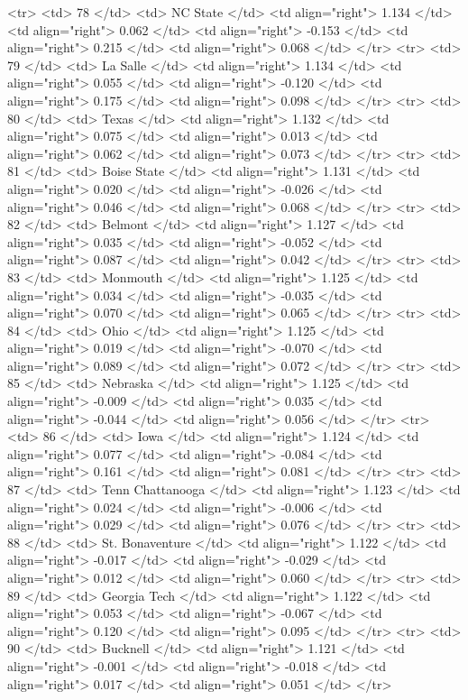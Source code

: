   <tr> <td> 78 </td> <td> NC State </td> <td align="right"> 1.134 </td> <td align="right"> 0.062 </td> <td align="right"> -0.153 </td> <td align="right"> 0.215 </td> <td align="right"> 0.068 </td> </tr>
  <tr> <td> 79 </td> <td> La Salle </td> <td align="right"> 1.134 </td> <td align="right"> 0.055 </td> <td align="right"> -0.120 </td> <td align="right"> 0.175 </td> <td align="right"> 0.098 </td> </tr>
  <tr> <td> 80 </td> <td> Texas </td> <td align="right"> 1.132 </td> <td align="right"> 0.075 </td> <td align="right"> 0.013 </td> <td align="right"> 0.062 </td> <td align="right"> 0.073 </td> </tr>
  <tr> <td> 81 </td> <td> Boise State </td> <td align="right"> 1.131 </td> <td align="right"> 0.020 </td> <td align="right"> -0.026 </td> <td align="right"> 0.046 </td> <td align="right"> 0.068 </td> </tr>
  <tr> <td> 82 </td> <td> Belmont </td> <td align="right"> 1.127 </td> <td align="right"> 0.035 </td> <td align="right"> -0.052 </td> <td align="right"> 0.087 </td> <td align="right"> 0.042 </td> </tr>
  <tr> <td> 83 </td> <td> Monmouth </td> <td align="right"> 1.125 </td> <td align="right"> 0.034 </td> <td align="right"> -0.035 </td> <td align="right"> 0.070 </td> <td align="right"> 0.065 </td> </tr>
  <tr> <td> 84 </td> <td> Ohio </td> <td align="right"> 1.125 </td> <td align="right"> 0.019 </td> <td align="right"> -0.070 </td> <td align="right"> 0.089 </td> <td align="right"> 0.072 </td> </tr>
  <tr> <td> 85 </td> <td> Nebraska </td> <td align="right"> 1.125 </td> <td align="right"> -0.009 </td> <td align="right"> 0.035 </td> <td align="right"> -0.044 </td> <td align="right"> 0.056 </td> </tr>
  <tr> <td> 86 </td> <td> Iowa </td> <td align="right"> 1.124 </td> <td align="right"> 0.077 </td> <td align="right"> -0.084 </td> <td align="right"> 0.161 </td> <td align="right"> 0.081 </td> </tr>
  <tr> <td> 87 </td> <td> Tenn Chattanooga </td> <td align="right"> 1.123 </td> <td align="right"> 0.024 </td> <td align="right"> -0.006 </td> <td align="right"> 0.029 </td> <td align="right"> 0.076 </td> </tr>
  <tr> <td> 88 </td> <td> St. Bonaventure </td> <td align="right"> 1.122 </td> <td align="right"> -0.017 </td> <td align="right"> -0.029 </td> <td align="right"> 0.012 </td> <td align="right"> 0.060 </td> </tr>
  <tr> <td> 89 </td> <td> Georgia Tech </td> <td align="right"> 1.122 </td> <td align="right"> 0.053 </td> <td align="right"> -0.067 </td> <td align="right"> 0.120 </td> <td align="right"> 0.095 </td> </tr>
  <tr> <td> 90 </td> <td> Bucknell </td> <td align="right"> 1.121 </td> <td align="right"> -0.001 </td> <td align="right"> -0.018 </td> <td align="right"> 0.017 </td> <td align="right"> 0.051 </td> </tr>
